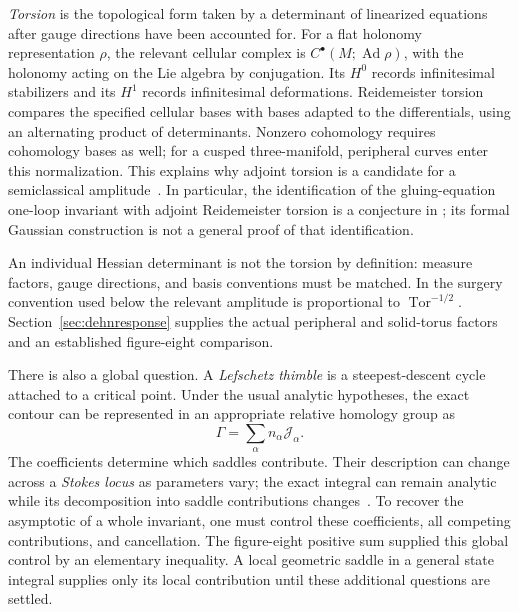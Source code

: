 \emph{Torsion} is the topological form taken by a determinant of
linearized equations after gauge directions have been accounted
for. For a flat holonomy representation $\rho$, the relevant
cellular complex is $C^\bullet(M;\operatorname{Ad}\rho)$, with the
holonomy acting on the Lie algebra by conjugation.
Its $H^0$ records infinitesimal stabilizers and its $H^1$ records
infinitesimal deformations. Reidemeister torsion compares the
specified cellular bases with bases adapted to the differentials,
using an alternating product of determinants. Nonzero cohomology
requires cohomology bases as well; for a cusped three-manifold,
peripheral curves enter this normalization. This explains why adjoint torsion is a candidate for a
semiclassical amplitude~\cite{WittenJones,DimofteGaroufalidis}.
In particular, the identification of the gluing-equation one-loop
invariant with adjoint Reidemeister torsion is a conjecture in
\cite[Conjecture~1.8]{DimofteGaroufalidis}; its formal Gaussian
construction is not a general proof of that identification.

An individual Hessian determinant is not the torsion by definition:
measure factors, gauge directions, and basis conventions must be
matched. In the surgery convention used below the relevant
amplitude is proportional to $\operatorname{Tor}^{-1/2}$.
Section~\ref{sec:dehnresponse} supplies the actual peripheral and
solid-torus factors and an established figure-eight comparison.

There is also a global question. A \emph{Lefschetz thimble} is a
steepest-descent cycle attached to a critical point. Under the
usual analytic hypotheses, the exact contour can be represented
in an appropriate relative homology group as
\[
 \Gamma=\sum_\alpha n_\alpha\mathcal J_\alpha.
\]
The coefficients determine which saddles contribute. Their
description can change across a \emph{Stokes locus} as parameters
vary; the exact integral can remain analytic while its decomposition
into saddle contributions changes~\cite[Sections 2--3]{WittenContinuation}.
To recover the asymptotic of a whole invariant, one must control
these coefficients, all competing contributions, and cancellation.
The figure-eight positive sum supplied this global control by an
elementary inequality. A local geometric saddle in a general
state integral supplies only its local contribution until these
additional questions are settled.

